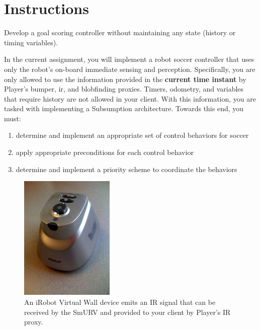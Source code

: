 \section{Instructions}

Develop a goal scoring controller without maintaining any state (history or timing variables).

In the current assignment, you will implement a robot soccer controller that uses only the robot's on-board immediate sensing and perception.  Specifically, you are only allowed to use the information provided in the {\bf current time instant} by Player's bumper, ir, and blobfinding proxies.  Timers, odometry, and variables that require history are not allowed in your client.  With this information, you are tasked with implementing a Subsumption architecture.  Towards this end, you must:

\begin{enumerate}
\item determine and implement an appropriate set of control behaviors for soccer
\item apply appropriate preconditions for each control behavior
\item determine and implement a priority scheme to coordinate the behaviors
\end{enumerate}

\begin{figure}[!ht]
\centering
\includegraphics[width=0.4\textwidth]{figures/9_virtual_wall.jpg}
\caption{An iRobot Virtual Wall device emits an IR signal that can be received by the SmURV and provided to your client by Player's IR proxy.}
\label{fig:virtual_wall}
\end{figure}

